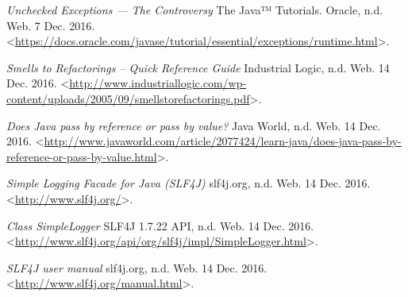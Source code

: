 \begin{thebibliography}{9}

\textit{Unchecked Exceptions — The Controversy} The Java™ Tutorials. Oracle, n.d. Web. 7 Dec. 2016. <\url{https://docs.oracle.com/javase/tutorial/essential/exceptions/runtime.html}>.



\textit{Smells to Refactorings -- Quick Reference Guide} Industrial Logic, n.d. Web. 14 Dec. 2016. <\url{http://www.industriallogic.com/wp-content/uploads/2005/09/smellstorefactorings.pdf}>.


\textit{Does Java pass by reference or pass by value?} Java World, n.d. Web. 14 Dec. 2016. <\url{http://www.javaworld.com/article/2077424/learn-java/does-java-pass-by-reference-or-pass-by-value.html}>.



\textit{Simple Logging Facade for Java (SLF4J)} slf4j.org, n.d. Web. 14 Dec. 2016. <\url{http://www.slf4j.org/}>.


\textit{Class SimpleLogger} SLF4J 1.7.22 API, n.d. Web. 14 Dec. 2016. <\url{http://www.slf4j.org/api/org/slf4j/impl/SimpleLogger.html}>.


\textit{SLF4J user manual} slf4j.org, n.d. Web. 14 Dec. 2016. <\url{http://www.slf4j.org/manual.html}>.


\end{thebibliography}
